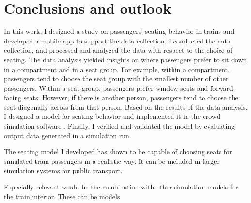 \chapter{Conclusions and outlook}



In this work, I designed a study on passengers' seating behavior in trains and
developed a mobile app to support the data collection.
I conducted the data collection, and processed and analyzed the data with
respect to the choice of seating.
The data analysis yielded insights on where passengers prefer to sit down in a
compartment and in a seat group. %
%
For example, within a compartment, passengers tend to choose the seat group
with the smallest number of other passengers.
Within a seat group, passengers prefer window seats and forward-facing seats.
However, if there is another person, passengers tend to choose the seat
diagonally across from that person.
%
Based on the results of the data analysis, I designed a model for seating
behavior and implemented it in the crowd simulation software \vadere.
Finally, I verified and validated the model by evaluating output data generated
in a simulation run.


The seating model I developed has shown to be capable of choosing seats for
simulated train passengers in a realistic way.
It can be included in larger simulation systems for public transport.


Especially relevant would be the combination with other simulation models for
the train interior.
These can be models

